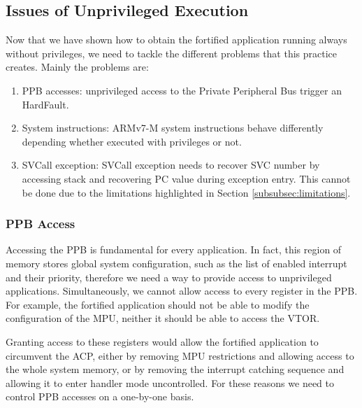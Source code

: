 \documentclass{article}
\begin{document}
\subsection{Issues of Unprivileged Execution}
Now that we have shown how to obtain the fortified application running always without privileges, we need to tackle the different problems that this practice creates. Mainly the problems are:
\begin{enumerate}
	\item PPB accesses: unprivileged access to the Private Peripheral Bus trigger an HardFault.
	\item System instructions: ARMv7-M system instructions behave differently depending whether executed with privileges or not.
	\item SVCall exception: SVCall exception needs to recover SVC number by accessing stack and recovering PC value during exception entry. This cannot be done due to the limitations highlighted in Section \ref{subsubsec:limitations}.
\end{enumerate}

\subsubsection{PPB Access}
\label{subsubsec:PPB_access}
Accessing the PPB is fundamental for every application. In fact, this region of memory stores global system configuration, such as the list of enabled interrupt and their priority, therefore we need a way to provide access to unprivileged applications.
Simultaneously, we cannot allow access to every register in the PPB. For example, the fortified application should not be able to modify the configuration of the MPU, neither it should be able to access the VTOR.

Granting access to these registers would allow the fortified application to circumvent the ACP, either by removing MPU restrictions and allowing access to the whole system memory, or by removing the interrupt catching sequence and allowing it to enter handler mode uncontrolled. For these reasons we need to control PPB accesses on a one-by-one basis.
\end{document}
